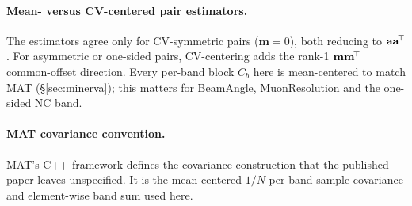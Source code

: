 \paragraph{Mean- versus CV-centered pair estimators.} The estimators agree only for CV-symmetric pairs ($\mathbf{m}=0$), both reducing to $\mathbf{a}\mathbf{a}^{\!\top}$. For asymmetric or one-sided pairs, CV-centering adds the rank-1 $\mathbf{m}\mathbf{m}^{\!\top}$ common-offset direction. Every per-band block $C_{b}$ here is mean-centered to match MAT (\S\ref{sec:minerva}); this matters for BeamAngle, MuonResolution and the one-sided NC band.

\paragraph{MAT covariance convention.} MAT's C++ framework defines the covariance construction that the published paper leaves unspecified. It is the mean-centered $1/N$ per-band sample covariance and element-wise band sum used here.

